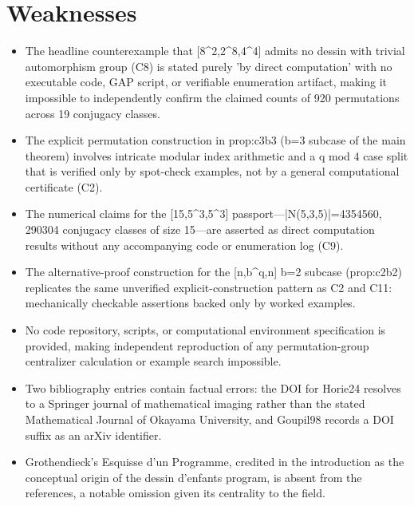 \documentclass[11pt]{article}
\begin{document}
\section*{Weaknesses}
\begin{itemize}[leftmargin=*]
  \item The headline counterexample that [8\^{}2,2\^{}8,4\^{}4] admits no dessin with trivial automorphism group (C8) is stated purely 'by direct computation' with no executable code, GAP script, or verifiable enumeration artifact, making it impossible to independently confirm the claimed counts of 920 permutations across 19 conjugacy classes.
  \item The explicit permutation construction in prop:c3b3 (b=3 subcase of the main theorem) involves intricate modular index arithmetic and a q mod 4 case split that is verified only by spot-check examples, not by a general computational certificate (C2).
  \item The numerical claims for the [15,5\^{}3,5\^{}3] passport---|N(5,3,5)|=4354560, 290304 conjugacy classes of size 15---are asserted as direct computation results without any accompanying code or enumeration log (C9).
  \item The alternative-proof construction for the [n,b\^{}q,n] b=2 subcase (prop:c2b2) replicates the same unverified explicit-construction pattern as C2 and C11: mechanically checkable assertions backed only by worked examples.
  \item No code repository, scripts, or computational environment specification is provided, making independent reproduction of any permutation-group centralizer calculation or example search impossible.
  \item Two bibliography entries contain factual errors: the DOI for Horie24 resolves to a Springer journal of mathematical imaging rather than the stated Mathematical Journal of Okayama University, and Goupil98 records a DOI suffix as an arXiv identifier.
  \item Grothendieck's Esquisse d'un Programme, credited in the introduction as the conceptual origin of the dessin d'enfants program, is absent from the references, a notable omission given its centrality to the field.
\end{itemize}
\end{document}
